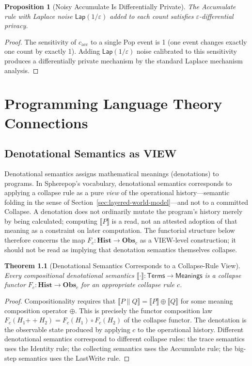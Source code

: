 \documentclass[12pt, a4paper, openany]{book}
\theoremstyle{plain}
\newtheorem{theorem}{Theorem}[chapter]
\newtheorem{proposition}[theorem]{Proposition}
\theoremstyle{definition}
\theoremstyle{remark}
\newcommand{\Hist}{\mathbf{Hist}}
\newcommand{\Obs}{\mathbf{Obs}}
\begin{document}
\begin{proposition}[Noisy Accumulate Is Differentially Private]
The Accumulate rule with Laplace noise $\mathsf{Lap}(1/\varepsilon)$ added to
each count satisfies $\varepsilon$-differential privacy.
\end{proposition}

\begin{proof}
The sensitivity of $c_{\mathrm{acc}}$ to a single Pop event is 1 (one event
changes exactly one count by exactly 1). Adding $\mathsf{Lap}(1/\varepsilon)$
noise calibrated to this sensitivity produces a differentially private mechanism
by the standard Laplace mechanism analysis.
\end{proof}

\chapter{Programming Language Theory Connections}

\section{Denotational Semantics as VIEW}

Denotational semantics assigns mathematical meanings (denotations) to programs.
In Spherepop's vocabulary, denotational semantics corresponds to applying a
collapse rule as a pure \emph{view} of the operational history---semantic
folding in the sense of Section~\ref{sec:layered-world-model}---and not to a
committed Collapse. A denotation does not ordinarily mutate the program's
history merely by being calculated; computing $\llbracket P \rrbracket$ is a
read, not an attested adoption of that meaning as a constraint on later
computation. The functorial structure below therefore concerns the map
$F_c : \Hist \to \Obs_c$ as a VIEW-level construction; it should not be read as
implying that denotation semantics themselves collapse.

\begin{theorem}[Denotational Semantics Corresponds to a Collapse-Rule View]
Every compositional denotational semantics $\llbracket \cdot \rrbracket :
\mathsf{Terms} \to \mathsf{Meanings}$ is a collapse functor
$F_c : \Hist \to \Obs_c$ for an appropriate collapse rule $c$.
\end{theorem}

\begin{proof}
Compositionality requires that $\llbracket P \parallel Q \rrbracket =
\llbracket P \rrbracket \oplus \llbracket Q \rrbracket$ for some meaning
composition operator $\oplus$. This is precisely the functor composition law
$F_c(H_1 \mathbin{++} H_2) = F_c(H_1) \circ F_c(H_2)$ of the collapse functor.
The denotation is the observable state produced by applying $c$ to the
operational history. Different denotational semantics correspond to different
collapse rules: the trace semantics uses the Identity rule; the collecting
semantics uses the Accumulate rule; the big-step semantics uses the LastWrite
rule.
\end{proof}
\end{document}
